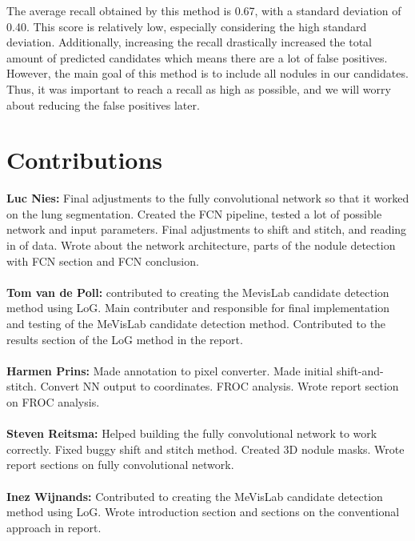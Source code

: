 \documentclass{article}
\begin{document}
The average recall obtained by this method is 0.67, with a standard deviation of 0.40. This score is relatively low, especially considering the high standard deviation. Additionally, increasing the recall drastically increased the total amount of predicted candidates which means there are a lot of false positives. However, the main goal of this method is to include all nodules in our candidates. Thus, it was important to reach a recall as high as possible, and we will worry about reducing the false positives later.


\appendix
\section{Contributions}
\textbf{Luc Nies:} Final adjustments to the fully convolutional network so that it worked on the lung segmentation. Created the FCN pipeline, tested a lot of possible network and input parameters. Final adjustments to shift and stitch, and reading in of data. Wrote about the network architecture, parts of the nodule detection with FCN section and FCN conclusion.\\
\\
\textbf{Tom van de Poll:} contributed to creating the MevisLab candidate detection method using LoG. Main contributer and responsible for final implementation and testing of the MeVisLab candidate detection method. Contributed to the results section of the LoG method in the report.\\
\\
\textbf{Harmen Prins:} Made annotation to pixel converter. Made initial shift-and-stitch. Convert NN output to coordinates. FROC analysis. Wrote report section on FROC analysis.
\\
\\
\textbf{Steven Reitsma:} Helped building the fully convolutional network to work correctly. Fixed buggy shift and stitch method. Created 3D nodule masks. Wrote report sections on fully convolutional network. \\
\\
\textbf{Inez Wijnands:} Contributed to creating the MeVisLab candidate detection method using LoG. Wrote introduction section and sections on the conventional approach in report.


\end{document}
